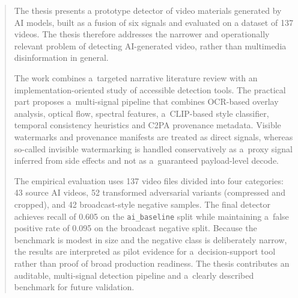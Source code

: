 \documentclass[pl,12pt,openany]{TAGH/t_agh_av}
\author{Bart\l{}omiej Pomiet\l{}o}
\date{2026}
\begin{document}
\titlepages
{}

\begin{abstract}
The thesis presents a prototype detector of video materials generated by AI models,
built as a fusion of six signals and evaluated on a dataset of 137 videos. The thesis therefore addresses
the narrower and operationally relevant problem of detecting AI-generated video, rather
than multimedia disinformation in general.

The work combines a~targeted narrative literature review with an implementation-oriented
study of accessible detection tools. The practical part proposes a~multi-signal pipeline
that combines OCR-based overlay analysis, optical flow, spectral features, a~CLIP-based
style classifier, temporal consistency heuristics and C2PA provenance metadata. Visible
watermarks and provenance manifests are treated as direct signals, whereas so-called
invisible watermarking is handled conservatively as a~proxy signal inferred from
side effects and not as a~guaranteed payload-level decode.

The empirical evaluation uses 137 video files divided into four categories: 43 source
AI videos, 52 transformed adversarial variants (compressed and cropped), and 42
broadcast-style negative samples. The final detector achieves recall of 0.605 on the
\texttt{ai\_baseline} split while maintaining a~false positive rate of 0.095 on the
broadcast negative split. Because the benchmark is modest in size and the negative class
is deliberately narrow, the results are interpreted as pilot evidence for a~decision-support
tool rather than proof of broad production readiness. The thesis contributes an auditable,
multi-signal detection pipeline and a~clearly described benchmark for future validation.
\end{abstract}

\end{document}
